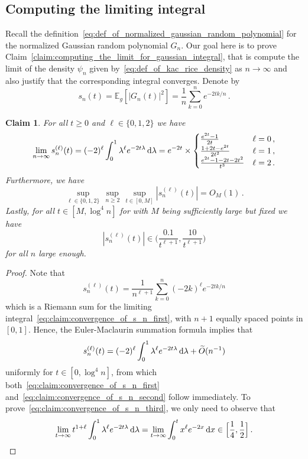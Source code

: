 \documentclass[11pt]{amsart}
\newtheorem{claim}[theorem]{Claim}
\theoremstyle{remark}
\theoremstyle{definition}
\def\la{{\lambda}}
\newcommand{\bE}{\mathbb E}
\begin{document}
    \subsection{Computing the limiting integral}
    Recall the definition~\eqref{eq:def_of_normalized_gaussian_random_polynomial} for the normalized Gaussian random polynomial $G_n$. Our goal here is to prove Claim~\ref{claim:computing_the_limit_for_gaussian_integral}, that is compute the limit of the density $\psi_n$ given by~\eqref{eq:def_of_kac_rice_density} as $n\to\infty$ and also justify that the corresponding integral converges. Denote by
    \begin{equation}
    \label{eq:def_of_s_n}
        s_n(t) = \bE_g[|G_n(t)|^2 ] = \frac{1}{n} \sum_{k=0}^n e^{-2tk/n} \, .
    \end{equation}
    \begin{claim}
        \label{claim:convergence_of_s_n}
        For all $t\ge 0$ and $\ell\in\{0,1,2\}$ we have
        \begin{equation}
        \label{eq:claim:convergence_of_s_n_first}
        \lim_{n\to\infty} s_n^{(\ell)}(t) = (-2)^{\ell} \int_{0}^1 \la^\ell e^{-2t\la } \, {\rm d}\la = e^{-2t}\times \begin{cases}
            \frac{e^{2t}-1}{2t} & \ell = 0 \, , \\ \frac{1+2t-e^{2t}}{2t^2} & \ell =1 \, , \\ \frac{e^{2t}-1-2t-2t^2}{t^3} & \ell = 2\, . 
        \end{cases}    
        \end{equation}
        Furthermore, we have
        \begin{equation}
        \label{eq:claim:convergence_of_s_n_second}
        \sup_{\ell\in\{0,1,2\}} \, \sup_{n\ge 2} \,  \sup_{t\in[0,M]} |s_n^{(\ell)}(t)| = O_M(1) \, .    
        \end{equation}
        Lastly, for all $t\in[M,\log^4 n]$ for with $M$ being sufficiently large but fixed we have
        \begin{equation}
        \label{eq:claim:convergence_of_s_n_third}
          |s_n^{(\ell)}(t)| \in \Big(\frac{0.1}{ t^{\ell + 1}},\frac{10}{t^{\ell +1}}\Big)  
        \end{equation}
        for all $n$ large enough. 
    \end{claim}
    \begin{proof}
    Note that
    \[
    s_n^{(\ell)}(t) = \frac{1}{n^{\ell + 1}}   \sum_{k=0}^{n} (-2k)^{\ell} e^{-2tk/n}
    \]
    which is a Riemann sum for the limiting integral~\eqref{eq:claim:convergence_of_s_n_first}, with $n+1$ equally spaced points in $[0,1]$. Hence, the Euler-Maclaurin summation formula implies that 
    \[
    s_n^{(\ell)}(t) = (-2)^{\ell} \int_{0}^1 \la^\ell e^{-2t\la } \, {\rm d}\la + \widetilde{O}(n^{-1}) 
    \]
    uniformly for $t\in[0,\log^4n]$, from which both~\eqref{eq:claim:convergence_of_s_n_first} and~\eqref{eq:claim:convergence_of_s_n_second} follow immediately. To prove~\eqref{eq:claim:convergence_of_s_n_third}, we only need to observe that 
    \[
    \lim_{t\to \infty} t^{1+\ell}  \int_{0}^1 \la^\ell e^{-2t\la } \, {\rm d}\la = \lim_{t\to\infty} \int_0^t x^\ell e^{-2x} \, {\rm d}x \in \Big[\frac14,\frac12\Big] \, . \qedhere
    \]
    \end{proof}
\end{document}
